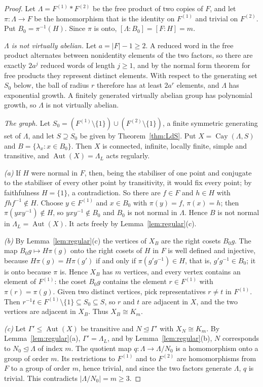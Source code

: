 \documentclass[11pt]{amsart}
\theoremstyle{definition}
\theoremstyle{remark}
\DeclareMathOperator{\Aut}{Aut}
\DeclareMathOperator{\Cay}{Cay}
\begin{document}
\begin{proof}
Let $\Lambda=F^{(1)}*F^{(2)}$ be the free product of two copies of $F$, and let $\pi\colon\Lambda\to F$ be the homomorphism that is the identity on $F^{(1)}$ and trivial on $F^{(2)}$. Put $B_0=\pi^{-1}(H)$. Since $\pi$ is onto, $[\Lambda:B_0]=[F:H]=m$.

\emph{$\Lambda$ is not virtually abelian.} Let $a=|F|-1\ge2$. A reduced word in the free product alternates between nonidentity elements of the two factors, so there are exactly $2a^j$ reduced words of length $j\ge1$, and by the normal form theorem for free products they represent distinct elements. With respect to the generating set $S_0$ below, the ball of radius $r$ therefore has at least $2a^r$ elements, and $\Lambda$ has exponential growth. A finitely generated virtually abelian group has polynomial growth, so $\Lambda$ is not virtually abelian.

\emph{The graph.} Let $S_0=(F^{(1)}\setminus\{1\})\cup(F^{(2)}\setminus\{1\})$, a finite symmetric generating set of $\Lambda$, and let $S\supseteq S_0$ be given by Theorem~\ref{thm:LdS}. Put $X=\Cay(\Lambda,S)$ and $B=\{\lambda_x:x\in B_0\}$. Then $X$ is connected, infinite, locally finite, simple and transitive, and $\Aut(X)=\Lambda_L$ acts regularly.

\emph{(a)} If $H$ were normal in $F$, then, being the stabiliser of one point and conjugate to the stabiliser of every other point by transitivity, it would fix every point; by faithfulness $H=\{1\}$, a contradiction. So there are $f\in F$ and $h\in H$ with $fhf^{-1}\notin H$. Choose $y\in F^{(1)}$ and $x\in B_0$ with $\pi(y)=f$, $\pi(x)=h$; then $\pi(yxy^{-1})\notin H$, so $yxy^{-1}\notin B_0$ and $B_0$ is not normal in $\Lambda$. Hence $B$ is not normal in $\Lambda_L=\Aut(X)$. It acts freely by Lemma~\ref{lem:regular}(c).

\emph{(b)} By Lemma~\ref{lem:regular}(c) the vertices of $X_B$ are the right cosets $B_0g$. The map $B_0g\mapsto H\pi(g)$ onto the right cosets of $H$ in $F$ is well defined and injective, because $H\pi(g)=H\pi(g')$ if and only if $\pi(g'g^{-1})\in H$, that is, $g'g^{-1}\in B_0$; it is onto because $\pi$ is. Hence $X_B$ has $m$ vertices, and every vertex contains an element of $F^{(1)}$: the coset $B_0g$ contains the element $r\in F^{(1)}$ with $\pi(r)=\pi(g)$. Given two distinct vertices, pick representatives $r\neq t$ in $F^{(1)}$. Then $r^{-1}t\in F^{(1)}\setminus\{1\}\subseteq S_0\subseteq S$, so $r$ and $t$ are adjacent in $X$, and the two vertices are adjacent in $X_B$. Thus $X_B\cong K_m$.

\emph{(c)} Let $\Gamma'\le\Aut(X)$ be transitive and $N\trianglelefteq\Gamma'$ with $X_N\cong K_m$. By Lemma~\ref{lem:regular}(a), $\Gamma'=\Lambda_L$, and by Lemma~\ref{lem:regular}(b), $N$ corresponds to $N_0\trianglelefteq\Lambda$ of index $m$. The quotient map $q\colon\Lambda\to\Lambda/N_0$ is a homomorphism onto a group of order $m$. Its restrictions to $F^{(1)}$ and to $F^{(2)}$ are homomorphisms from $F$ to a group of order $m$, hence trivial, and since the two factors generate $\Lambda$, $q$ is trivial. This contradicts $|\Lambda/N_0|=m\ge3$.
\end{proof}
\end{document}
